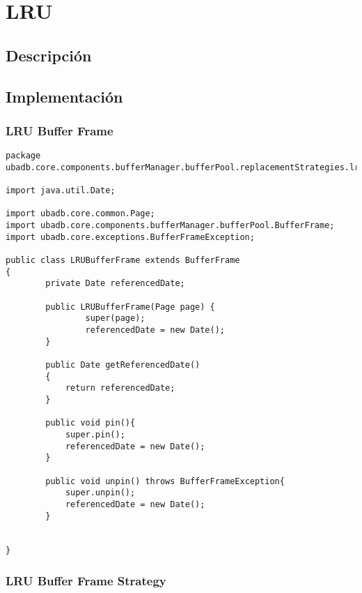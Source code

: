 \section{LRU}

\subsection{Descripción}

\subsection{Implementación}

\subsubsection{LRU Buffer Frame}

\begin{lstlisting}
package ubadb.core.components.bufferManager.bufferPool.replacementStrategies.lru;

import java.util.Date;

import ubadb.core.common.Page;
import ubadb.core.components.bufferManager.bufferPool.BufferFrame;
import ubadb.core.exceptions.BufferFrameException;

public class LRUBufferFrame extends BufferFrame 
{                
		private Date referencedDate;
	
        public LRUBufferFrame(Page page) {
                super(page);     
                referencedDate = new Date();
        }
        
        public Date getReferencedDate()
    	{
    		return referencedDate;
    	}
        
        public void pin(){
        	super.pin();
        	referencedDate = new Date();
        }
        
        public void unpin() throws BufferFrameException{
        	super.unpin();
        	referencedDate = new Date();
        }


}
\end{lstlisting}

\subsubsection{LRU Buffer Frame Strategy}

